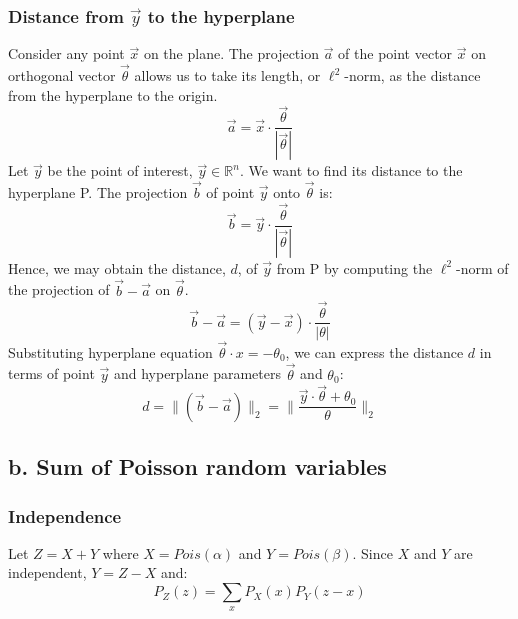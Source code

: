 \documentclass[9pt,twocolumn]{article}
\begin{document}
		\subsubsection*{Distance from $\vec{y}$ to the hyperplane}
			Consider any point $\vec{x}$ on the plane. The projection $\vec{a}$ of the point vector $\vec{x}$ on orthogonal vector $\vec{\theta}$
			allows us to take its length, or $\ell^2$-norm, as the distance from the hyperplane to the origin.
			\begin{equation}
				\vec{a} = \vec{x}\cdot \frac{\vec{\theta}}{|\vec{\theta}|}
			\end{equation}
			Let $\vec{y}$ be the point of interest, $\vec{y}\in\mathbb{R}^n$. We want to find its distance to the hyperplane P. The projection $\vec{b}$ of point $\vec{y}$ onto $\vec{\theta}$ is:
			\begin{equation}
				\vec{b} = \vec{y}\cdot \frac{\vec{\theta}}{|\vec{\theta}|}
			\end{equation}
			Hence, we may obtain the distance, $d$, of $\vec{y}$ from P by computing the $\ell^2$-norm of the projection of $\vec{b}-\vec{a}$ on $\vec{\theta}$.
			\begin{equation}
				\vec{b} - \vec{a} = (\vec{y}-\vec{x})\cdot\frac{\vec{\theta}}{|\theta|}
			\end{equation}
			Substituting hyperplane equation $\vec{\theta}\cdot x = -\theta_0$, we can express the distance $d$ in terms of point $\vec{y}$ and hyperplane parameters $\vec{\theta}$ and $\theta_0$:
			\begin{equation}
				d = \lVert(\vec{b}-\vec{a})\rVert_2 = \biggl \lVert \frac{\vec{y}\cdot\vec{\theta} + \theta_0}{\theta} \biggr \rVert_2
			\end{equation}

	\subsection*{b. Sum of Poisson random variables}
		\subsubsection*{Independence}
			Let $Z = X + Y$ where $X = Pois(\alpha)$ and $Y = Pois(\beta)$. Since $X$ and $Y$ are independent, $Y = Z - X$ and:
			\begin{equation}
				P_Z(z) = \sum_{x}P_X(x)P_Y(z-x)
			\end{equation}
\end{document}
